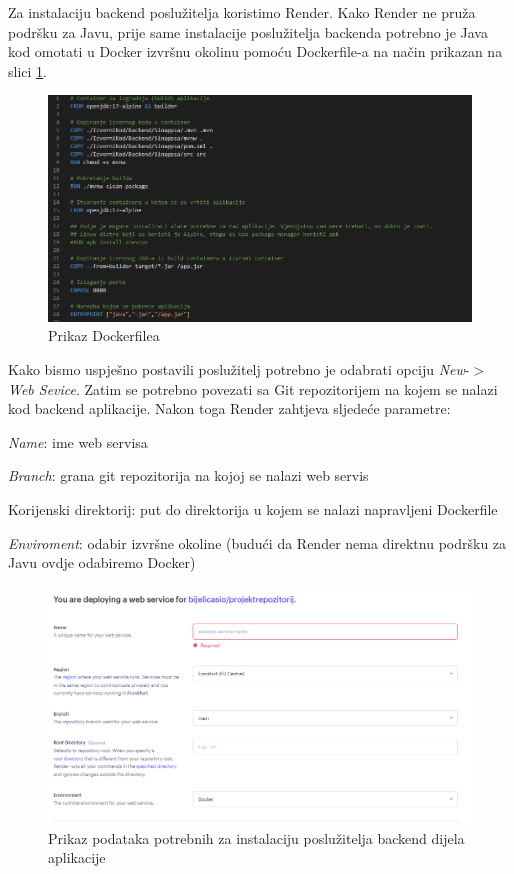 			Za instalaciju backend poslužitelja koristimo Render. Kako Render ne pruža podršku za Javu, prije same instalacije poslužitelja backenda potrebno je Java kod omotati u Docker izvršnu okolinu pomoću Dockerfile-a na način prikazan na slici \ref{fig:dockerfile}.
			\begin{figure}[H]
				\includegraphics[scale=0.5]{slike/slika4.png}
				\centering
				\caption{Prikaz Dockerfilea}
				\label{fig:dockerfile}
			\end{figure}
			
			Kako bismo uspješno postavili poslužitelj potrebno je odabrati opciju \textit{New}-$>$\textit{Web Sevice}. Zatim se potrebno povezati sa Git repozitorijem na kojem se nalazi kod backend aplikacije. Nakon toga Render zahtjeva sljedeće parametre:
			\begin{packed_item}
				\item \textit{Name}: ime web servisa 
				\item \textit{Branch}: grana git repozitorija na kojoj se nalazi web servis 
				\item Korijenski direktorij: put do direktorija u kojem se nalazi napravljeni Dockerfile
				\item \textit{Enviroment}: odabir izvršne okoline (budući da Render nema direktnu podršku za Javu ovdje odabiremo Docker)
			\end{packed_item}
			\begin{figure}[H]
				\includegraphics[scale=0.4]{slike/slika5.png}
				\centering
				\caption{Prikaz podataka potrebnih za instalaciju poslužitelja backend dijela aplikacije}
				\label{fig:backend pod}
			\end{figure}
		
